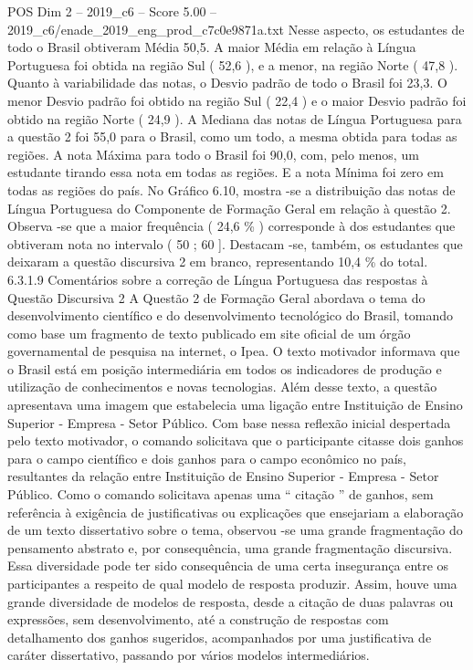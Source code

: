 \begin{textsample}{POS Dim 2 – 2019\_c6 – Score 5.00 – 2019\_c6/enade\_2019\_eng\_prod\_c7c0e9871a.txt}
Nesse aspecto, os estudantes de todo o Brasil obtiveram Média 50,5.
A maior Média em relação à Língua Portuguesa foi obtida na região Sul ( 52,6 ), e a menor, na região Norte ( 47,8 ).
Quanto à variabilidade das notas, o Desvio padrão de todo o Brasil foi 23,3.
O menor Desvio padrão foi obtido na região Sul ( 22,4 ) e o maior Desvio padrão foi obtido na região Norte ( 24,9 ).
A Mediana das notas de Língua Portuguesa para a questão 2 foi 55,0 para o Brasil, como um todo, a mesma obtida para todas as regiões.
A nota Máxima para todo o Brasil foi 90,0, com, pelo menos, um estudante tirando essa nota em todas as regiões.
E a nota Mínima foi zero em todas as regiões do país.
No Gráfico 6.10, mostra -se a distribuição das notas de Língua Portuguesa do Componente de Formação Geral em relação à questão 2.
Observa -se que a maior frequência ( 24,6 \% ) corresponde à dos estudantes que obtiveram nota no intervalo ( 50 ; 60 ].
Destacam -se, também, os estudantes que deixaram a questão discursiva 2 em branco, representando 10,4 \% do total. 6.3.1.9 Comentários sobre a correção de Língua Portuguesa das respostas à Questão Discursiva 2 A Questão 2 de Formação Geral abordava o tema do desenvolvimento científico e do desenvolvimento tecnológico do Brasil, tomando como base um fragmento de texto publicado em site oficial de um órgão governamental de pesquisa na internet, o Ipea.
O texto motivador informava que o Brasil está em posição intermediária em todos os indicadores de produção e utilização de conhecimentos e novas tecnologias.
Além desse texto, a questão apresentava uma imagem que estabelecia uma ligação entre Instituição de Ensino Superior - Empresa - Setor Público.
Com base nessa reflexão inicial despertada pelo texto motivador, o comando solicitava que o participante citasse dois ganhos para o campo científico e dois ganhos para o campo econômico no país, resultantes da relação entre Instituição de Ensino Superior - Empresa - Setor Público.
Como o comando solicitava apenas uma “ citação ” de ganhos, sem referência à exigência de justificativas ou explicações que ensejariam a elaboração de um texto dissertativo sobre o tema, observou -se uma grande fragmentação do pensamento abstrato e, por consequência, uma grande fragmentação discursiva.
Essa diversidade pode ter sido consequência de uma certa insegurança entre os participantes a respeito de qual modelo de resposta produzir.
Assim, houve uma grande diversidade de modelos de resposta, desde a citação de duas palavras ou expressões, sem desenvolvimento, até a construção de respostas com detalhamento dos ganhos sugeridos, acompanhados por uma justificativa de caráter dissertativo, passando por vários modelos intermediários.

\end{textsample}
